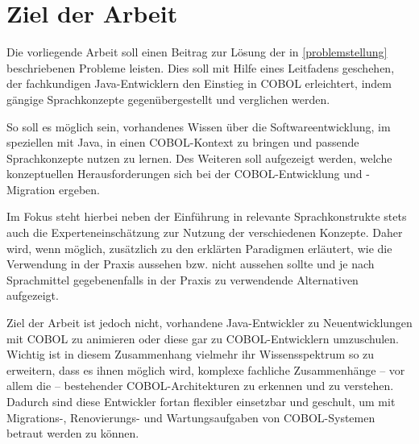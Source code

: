 \section{Ziel der Arbeit}
Die vorliegende Arbeit soll einen Beitrag zur Lösung der in \autoref{problemstellung} beschriebenen Probleme leisten. Dies soll mit Hilfe eines Leitfadens geschehen, der fachkundigen Java-Entwicklern den Einstieg in COBOL erleichtert, indem gängige Sprachkonzepte gegenübergestellt und verglichen werden. 

So soll es möglich sein, vorhandenes Wissen über die Softwareentwicklung, im speziellen mit Java, in einen COBOL-Kontext zu bringen und passende Sprachkonzepte nutzen zu lernen. Des Weiteren soll aufgezeigt werden, welche konzeptuellen Herausforderungen sich bei der COBOL-Entwicklung und -Migration ergeben.

Im Fokus steht hierbei neben der Einführung in relevante Sprachkonstrukte stets auch die Experteneinschätzung zur Nutzung der verschiedenen Konzepte. Daher wird, wenn möglich, zusätzlich zu den erklärten Paradigmen erläutert, wie die Verwendung in der Praxis aussehen bzw. nicht aussehen sollte und je nach Sprachmittel gegebenenfalls in der Praxis zu verwendende Alternativen aufgezeigt.

Ziel der Arbeit ist jedoch nicht, vorhandene Java-Entwickler zu Neuentwicklungen mit COBOL zu animieren oder diese gar zu COBOL-Entwicklern umzuschulen. Wichtig ist in diesem Zusammenhang vielmehr ihr Wissensspektrum so zu erweitern, dass es ihnen möglich wird, komplexe fachliche Zusammenhänge -- vor allem die  -- bestehender COBOL-Architekturen zu erkennen und zu verstehen. Dadurch sind diese Entwickler fortan flexibler einsetzbar und geschult, um mit Migrations-, Renovierungs- und Wartungsaufgaben von COBOL-Systemen betraut werden zu können.